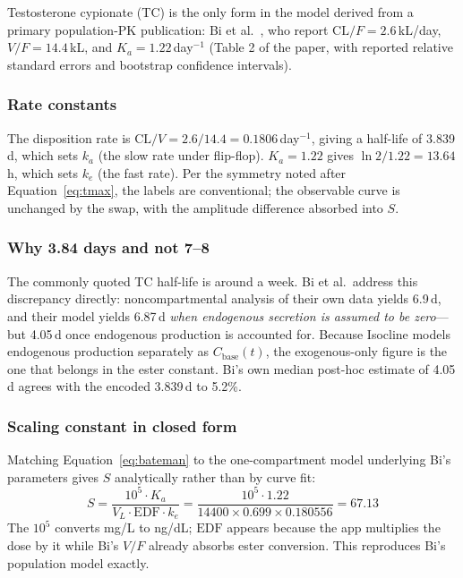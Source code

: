 \documentclass[11pt,a4paper]{article}
\begin{document}
Testosterone cypionate (TC) is the only form in the model derived from a
primary population-PK publication: Bi et al.~\cite{bi2018}, who report
$\mathrm{CL}/F = 2.6$\,kL/day, $V/F = 14.4$\,kL, and $K_a =
1.22$\,day$^{-1}$ (Table 2 of the paper, with reported relative standard
errors and bootstrap confidence intervals).

\subsubsection{Rate constants}

The disposition rate is $\mathrm{CL}/V = 2.6/14.4 = 0.1806$\,day$^{-1}$,
giving a half-life of 3.839\,d, which sets $k_a$ (the slow rate under
flip-flop). $K_a = 1.22$ gives $\ln 2 / 1.22 = 13.64$\,h, which sets
$k_e$ (the fast rate). Per the symmetry noted after
Equation~\ref{eq:tmax}, the labels are conventional; the observable
curve is unchanged by the swap, with the amplitude difference absorbed
into $S$.

\subsubsection{Why 3.84 days and not 7--8}

The commonly quoted TC half-life is around a week. Bi et al.\ address
this discrepancy directly: noncompartmental analysis of their own data
yields 6.9\,d, and their model yields 6.87\,d \emph{when endogenous
secretion is assumed to be zero}---but 4.05\,d once endogenous production
is accounted for. Because Isocline models endogenous production separately as
$C_{\text{base}}(t)$, the exogenous-only figure is the one that belongs
in the ester constant. Bi's own median post-hoc estimate of 4.05\,d
agrees with the encoded 3.839\,d to 5.2\%.

\subsubsection{Scaling constant in closed form}

Matching Equation~\ref{eq:bateman} to the one-compartment model
underlying Bi's parameters gives $S$ analytically rather than by curve
fit:
\begin{equation}
S = \frac{10^5 \cdot K_a}{V_L \cdot \mathrm{EDF} \cdot k_e}
  = \frac{10^5 \cdot 1.22}{14400 \times 0.699 \times 0.180556} = 67.13
\label{eq:tcS}
\end{equation}
The $10^5$ converts mg/L to ng/dL; $\mathrm{EDF}$ appears because the
app multiplies the dose by it while Bi's $V/F$ already absorbs ester
conversion. This reproduces Bi's population model exactly.
\end{document}
